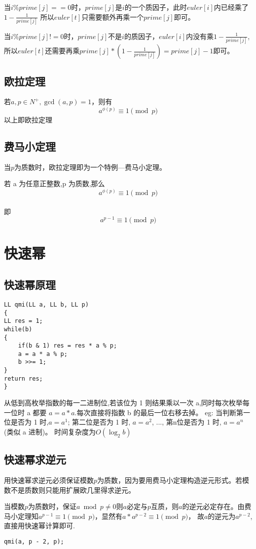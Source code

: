 \documentclass[]{book}
\begin{document}
当$i\%prime[j]==0$时，$prime[j]$是$i$的一个质因子，此时$euler[i]$内已经乘了$1-\frac{1}{prime[j]}$
所以$euler[t]$只需要额外再乘一个$prime[j]$即可。

当$i\%prime[j]!=0$时，$prime[j]$不是$i$的质因子，$euler[i]$内没有乘$1-\frac{1}{prime[j]}$,
所以$euler[t]$还需要再乘$prime[j]*(1-\frac{1}{prime[j]}) = prime[j] - 1$即可。

\section{欧拉定理}
若$a,p\in N ^+,\gcd(a, p) = 1$，则有
\[a^{\phi(p)}\equiv 1 \pmod{p}\]
以上即欧拉定理
\section{费马小定理}
当$p$为质数时，欧拉定理即为一个特例---费马小定理。

若 a 为任意正整数,p 为质数,那么
\[a^{\phi(p)}\equiv 1 \pmod{p}\]\\即
\[a^{p-1}\equiv 1 \pmod{p}\]
\chapter{快速幂}
\section{快速幂原理}
\begin{lstlisting}
LL qmi(LL a, LL b, LL p)
{
LL res = 1;
while(b)
{
    if(b & 1) res = res * a % p;
    a = a * a % p;
    b >>= 1;
}
return res;
}
\end{lstlisting}
从低到高枚举指数的每一二进制位,若该位为 1 则结果乘以一次 a,同时每次枚举每一位时 a 都要 $a = a * a$.每次直接将指数 b 的最后一位右移去掉。
eg: 当判断第一位是否为 1 时,$a = a^{1}$; 第二位是否为 1 时, $a = a^{2}$, ..., 第n位是否为 1 时, $a = a^{n}$(类似 a 进制)。
时间复杂度为$O(\log_{2}{b})$

\section{快速幂求逆元}
用快速幂求逆元必须保证模数$p$为质数，因为要用费马小定理构造逆元形式。若模数不是质数则只能用扩展欧几里得求逆元。

当模数$p$为质数时，保证$a\bmod p \neq 0$则$a$必定与$p$互质，则$a$的逆元必定存在。由费马小定理知$a^{p-1} \equiv 1 \pmod{p}$，显然有$a*a^{p-2} \equiv 1 \pmod{p}$，
故$a$的逆元为$a^{p-2}$, 直接用快速幂计算即可.
\begin{lstlisting}
qmi(a, p - 2, p);
\end{lstlisting}
\end{document}
